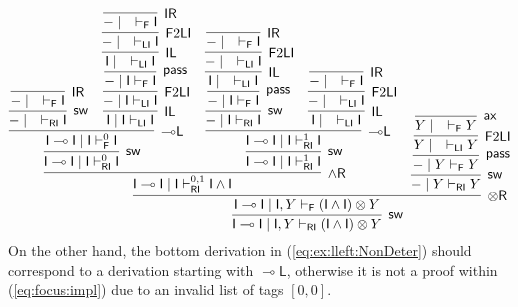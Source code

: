 \documentclass[submission,copyright,creativecommons]{eptcs}
\theoremstyle{definition}
\newcommand{\tr}{\otimes \mathsf{R}}
\newcommand{\lleft}{{\multimap}\mathsf{L}}
\newcommand{\pass}{\mathsf{pass}}
\newcommand{\unitl}{\mathsf{IL}}
\newcommand{\unitr}{\mathsf{IR}}
\newcommand{\andr}{\land \mathsf{R}}
\newcommand{\ax}{\mathsf{ax}}
\newcommand{\ot}{\otimes}
\newcommand{\lolli}{\multimap}
\newcommand{\I}{\mathsf{I}}
\newcommand{\RI}{\mathsf{RI}}
\newcommand{\LI}{\mathsf{LI}}
\newcommand{\F}{\mathsf{F}}
\newcommand{\sw}{\mathsf{sw}}
\newcommand{\proofbox}[1]{\begin{tabular}{l} #1 \end{tabular}}
\begin{document}
\begin{displaymath}
  \infer[\sw]{\I \lolli \I \mid \I , Y \vdash_{\RI} (\I \land \I) \ot Y}{
    \infer[\tr]{\I \lolli \I \mid \I , Y \vdash_{\F} (\I \land \I) \ot Y}{
      \infer[\andr]{\I \lolli \I \mid \I \vdash^{0 , 1}_{\RI} \I \land \I}{
        \infer[\sw]{\I \lolli \I \mid \I \vdash^{0}_{\RI} \I}{
          \infer[\lleft]{\I \lolli \I \mid \I \vdash^{0}_{\F} \I}{
            \infer[\sw]{- \mid \quad \vdash_{\RI} \I}{
              \infer[\unitr]{- \mid \quad \vdash_{\F} \I}{}
            }
            &
            \infer[\unitl]{\I \mid \I \vdash_{\LI} \I}{
              \infer[\F 2 \LI]{- \mid \I \vdash_{\LI} \I}{
                \infer[\pass]{- \mid \I \vdash_{\F} \I}{
                  \infer[\unitl]{\I \mid \quad \vdash_{\LI} \I}{
                    \infer[\F 2 \LI]{- \mid \quad \vdash_{\LI} \I}{
                      \infer[\unitr]{- \mid \quad \vdash_{\F} \I}{}
                    }
                  }
                }
              }
            }
          }
        }
        &
        \infer[\sw]{\I \lolli \I \mid \I \vdash^{1}_{\RI} \I}{
          \infer[\lleft]{\I \lolli \I \mid \I \vdash^{1}_{\RI} \I}{
            \infer[\sw]{- \mid \I \vdash_{\RI} \I}{
              \infer[\pass]{- \mid \I \vdash_{\F} \I}{
                \infer[\unitl]{\I \mid \quad \vdash_{\LI} \I}{
                  \infer[\F 2 \LI]{- \mid \quad \vdash_{\LI} \I}{
                    \infer[\unitr]{- \mid \quad \vdash_{\F} \I}{}
                  }
                }
              }
            }
            &
            \infer[\unitl]{\I \mid \quad \vdash_{\LI} \I}{
              \infer[\F 2 \LI]{- \mid \quad \vdash_{\LI} \I}{
                \infer[\unitr]{- \mid \quad \vdash_{\F} \I}{}
              }
            }
          }
        }
      }
      &
      \infer[\sw]{- \mid Y \vdash_{\RI} Y}{
        \infer[\pass]{- \mid Y \vdash_{\F} Y}{
          \infer[\F 2 \LI]{Y \mid \quad \vdash_{\LI} Y}{
            \infer[\ax]{Y \mid \quad \vdash_{\F} Y}{}
          }
        }
      }
    }
  }
\end{displaymath}
On the other hand, the bottom derivation in (\ref{eq:ex:lleft:NonDeter}) should correspond to a derivation starting with $\lleft$, otherwise it is not a proof within (\ref{eq:focus:impl}) due to an invalid list of tags $[0 , 0]$.
\end{document}
